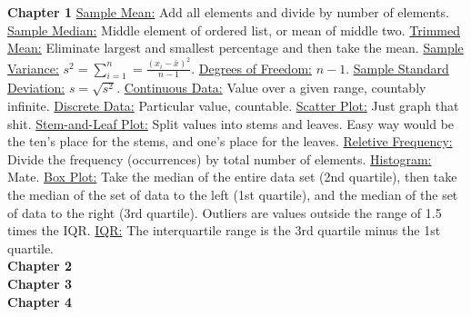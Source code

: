 \documentclass[9pt]{article}
\newcommand*\mean[1]{\bar{#1}}
\begin{document}
    \noindent\textbf{Chapter 1}
    \underline{Sample Mean:} Add all elements and divide by number of elements. 
    \underline{Sample Median:} Middle element of ordered list, or mean of middle two.
    \underline{Trimmed Mean:} Eliminate largest and smallest percentage and then take the mean.
    \underline{Sample Variance:} $s^2 = \sum_{i=1}^{n}=\frac{(x_i-\mean{x})^2}{n-1}$.
    \underline{Degrees of Freedom:} $n-1$.
    \underline{Sample Standard Deviation:} $s = \sqrt{s^2}$.
    \underline{Continuous Data:} Value over a given range, countably infinite.
    \underline{Discrete Data:} Particular value, countable.
    \underline{Scatter Plot:} Just graph that shit.
    \underline{Stem-and-Leaf Plot:} Split values into stems and leaves. Easy way would be the ten's place for the stems, and one's place for the leaves.
    \underline{Reletive Frequency:} Divide the frequency (occurrences) by total number of elements.
    \underline{Histogram:} Mate.
    \underline{Box Plot:} Take the median of the entire data set (2nd quartile), then take the median of the set of data to the left (1st quartile), and the median of the set of data to the right (3rd quartile). Outliers are values outside the range of 1.5 times the IQR.
    \underline{IQR:} The interquartile range is the 3rd quartile minus the 1st quartile.
    \\
    \noindent\textbf{Chapter 2}
    \\
    \noindent\textbf{Chapter 3}
    \\
    \noindent\textbf{Chapter 4}
\end{document}
